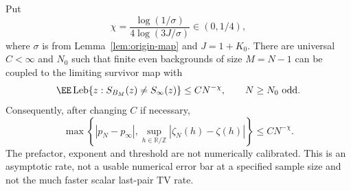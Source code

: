 \documentclass[11pt,letterpaper]{article}
\newcommand{\T}{\mathbb R/\mathbb Z}\newcommand{\Leb}{\operatorname{Leb}}
\begin{document}
\begin{theorem}
\label{thm:polynomial-noise-rate}
Put
\[
 \chi=\frac{\log(1/\sigma)}{4\log(3J/\sigma)}\in(0,1/4),
\]
where $\sigma$ is from Lemma~\ref{lem:origin-map} and $J=1+K_0$.
There are universal $C<\infty$ and $N_0$ such that finite even backgrounds
of size $M=N-1$ can be coupled to the limiting survivor map with
\begin{equation}\label{eq:full-map-rate}
 \EE\Leb\{z:S_{B_M}(z)\ne S_\infty(z)\}
 \le C N^{-\chi},
 \qquad N\ge N_0\ \hbox{odd}.
\end{equation}
Consequently, after changing $C$ if necessary,
\begin{equation}\label{eq:noise-polynomial-rate}
 \max\left\{|p_N-p_\infty|,
          \sup_{h\in\T}|\zeta_N(h)-\zeta(h)|\right\}
 \le C N^{-\chi}.
\end{equation}
The prefactor, exponent and threshold are not numerically calibrated. This is
an asymptotic rate, not a usable numerical error bar at a specified
sample size and not the much faster scalar last-pair TV rate.
\end{theorem}
\end{document}
